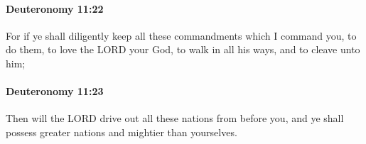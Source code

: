 		\paragraph{Deuteronomy 11:22} %
			\label{DEUTERONOMY-11-22}

			For if ye shall diligently keep all these commandments which I command you, to do them, to love the LORD your God, to walk in all his ways, and to cleave unto him;


		\paragraph{Deuteronomy 11:23} %
			\label{DEUTERONOMY-11-23}

			Then will the LORD drive out all these nations from before you, and ye shall possess greater nations and mightier than yourselves.


